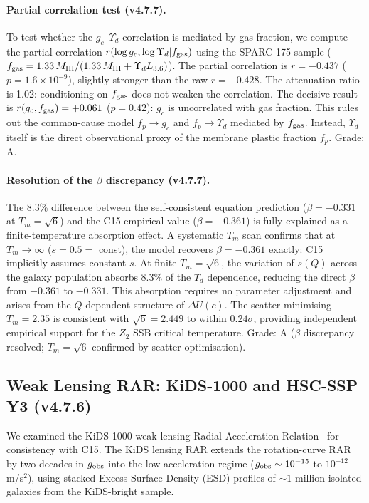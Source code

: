 \documentclass[11pt,a4paper]{article}
\newcommand{\e}[1]{\times 10^{#1}}
\newcommand{\gobs}{g_{\rm obs}}
\newcommand{\gc}{g_{c}}
\newcommand{\Yd}{\Upsilon_{d}}
\newcommand{\Tm}{T_{m}}
\newcommand{\fgas}{f_{\rm gas}}
\newcommand{\fp}{f_{p}}
\begin{document}
\paragraph{Partial correlation test (v4.7.7).}
To test whether the $\gc$--$\Yd$ correlation is mediated by gas fraction, we compute the partial correlation
$r(\log\gc, \log\Yd | \fgas)$ using the SPARC 175 sample ($\fgas = 1.33\,M_{\rm HI}/(1.33\,M_{\rm HI} + \Yd
L_{3.6})$). The partial correlation is $r = -0.437$ ($p = 1.6\e{-9}$), slightly stronger than the raw
$r = -0.428$. The attenuation ratio is 1.02: conditioning on $\fgas$ does not weaken the correlation. The
decisive result is $r(\gc, \fgas) = +0.061$ ($p = 0.42$): $\gc$ is uncorrelated with gas fraction. This rules
out the common-cause model $\fp \to \gc$ and $\fp \to \Yd$ mediated by $\fgas$. Instead, $\Yd$ itself is the
direct observational proxy of the membrane plastic fraction $\fp$. Grade: A.

\paragraph{Resolution of the $\beta$ discrepancy (v4.7.7).}
The 8.3\% difference between the self-consistent equation prediction ($\beta = -0.331$ at $\Tm = \sqrt{6}$)
and the C15 empirical value ($\beta = -0.361$) is fully explained as a finite-temperature absorption effect.
A systematic $\Tm$ scan confirms that at $\Tm \to \infty$ ($s = 0.5 =$ const), the model recovers $\beta =
-0.361$ exactly: C15 implicitly assumes constant $s$. At finite $\Tm = \sqrt{6}$, the variation of $s(Q)$
across the galaxy population absorbs 8.3\% of the $\Yd$ dependence, reducing the direct $\beta$ from $-0.361$
to $-0.331$. This absorption requires no parameter adjustment and arises from the $Q$-dependent structure of
$\Delta U(c)$. The scatter-minimising $\Tm = 2.35$ is consistent with $\sqrt{6} = 2.449$ to within
$0.24\sigma$, providing independent empirical support for the $Z_2$ SSB critical temperature. Grade: A
($\beta$ discrepancy resolved; $\Tm = \sqrt{6}$ confirmed by scatter optimisation).

\subsection{Weak Lensing RAR: KiDS-1000 and HSC-SSP Y3 (v4.7.6)}
We examined the KiDS-1000 weak lensing Radial Acceleration Relation~\citep{Brouwer2021} for consistency with
C15. The KiDS lensing RAR extends the rotation-curve RAR by two decades in $\gobs$ into the low-acceleration
regime ($\gobs \sim 10^{-15}$ to $10^{-12}$ m/s$^2$), using stacked Excess Surface Density (ESD) profiles of
$\sim 1$ million isolated galaxies from the KiDS-bright sample.
\end{document}
